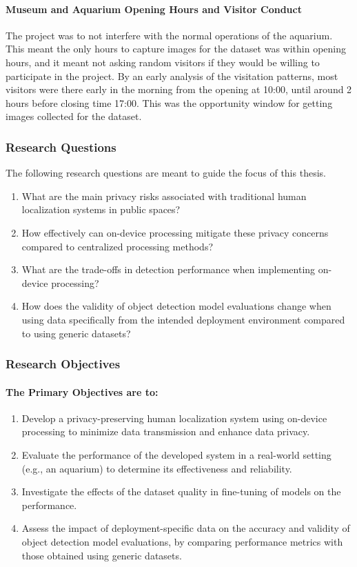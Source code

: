 \paragraph{Museum and Aquarium Opening Hours and Visitor Conduct}
\label{sec:scope_opening_hours}
The project was to not interfere with the normal operations of the aquarium. This meant the only hours to capture images for the dataset was within opening hours, and it meant not asking random visitors if they would be willing to participate in the project. By an early analysis of the visitation patterns, most visitors were there early in the morning from the opening at 10:00, until around 2 hours before closing time 17:00. This was the opportunity window for getting images collected for the dataset.  

\subsubsection{Research Questions}
\label{sec:research_questions}
The following research questions are meant to guide the focus of this thesis.
\begin{enumerate}
	\item What are the main privacy risks associated with traditional human localization systems in public spaces?
	\item How effectively can on-device processing mitigate these privacy concerns compared to centralized processing methods?
	\item What are the trade-offs in detection performance when implementing on-device processing?
	\item How does the validity of object detection model evaluations change when using data specifically from the intended deployment environment compared to using generic datasets?
\end{enumerate}

\subsubsection{Research Objectives}
\label{sec:research_objectives}
\paragraph{The Primary Objectives are to:}
\begin{enumerate}
	\item Develop a privacy-preserving human localization system using on-device processing to minimize data transmission and enhance data privacy.
	\item Evaluate the performance of the developed system in a real-world setting (e.g., an aquarium) to determine its effectiveness and reliability.
	\item Investigate the effects of the dataset quality in fine-tuning of models on the performance.
	\item Assess the impact of deployment-specific data on the accuracy and validity of object detection model evaluations, by comparing performance metrics with those obtained using generic datasets.
\end{enumerate}

